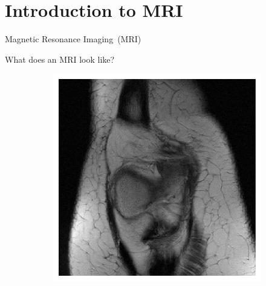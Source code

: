 \section{Introduction to MRI}

\begin{frame}[plain,c]
    
    \begin{center}
        \color{DarkBlue}
    \Huge Magnetic Resonance Imaging~(MRI)
    \end{center}
    
\end{frame}

\begin{frame}{What does an MRI look like?}
    \begin{figure}
        \centering
        \begin{subfigure}{0.45\textwidth}
            \includegraphics[height=0.6\textheight]{Figures/intro_figures/example_knee_fastmri.pdf}
        \end{subfigure}
        \begin{subfigure}{0.45\textwidth}

\end{subfigure}
\end{figure}
\end{frame}
